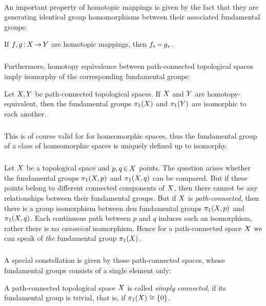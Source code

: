 \documentclass[11pt,twoside]{article}
\begin{document}
\paragraph{}
An important property of homotopic mappings is given by the fact
that they are generating identical group homomorphisms between their associated
fundamental groups:

\begin{theorem1}
If $f,g{\,:\,}X {\,\to\,} Y$ are homotopic mappings,
then $f_{*} {\,=\,} g_{*}$.
\end{theorem1}

\subparagraph{}
Furthermore,
homotopy equivalence between path-connected topological spaces
imply isomorphy of the corresponding fundamental groups:

\begin{theorem1}
Let $X,Y$ be path-connected topological spaces.
If $X$ and $Y$ are homotopy-equivalent,
then the fundamental groups $\pi_1(X)$ and $\pi_1(Y)$
are isomorphic to each another.
\end{theorem1}

\subparagraph{}
This is of course valid for for homeomorphic spaces,
thus the fundamental group of a class of homeomorphic spaces
is uniquely defined up to isomorphy.

\subparagraph{}
Let $X$ be a topological space and $p,q {\,\in\,} X$ points.
The question arises
whether the fundamental groups $\pi_1(X,p)$ and $\pi_1(X,q)$
can be compared.
But if these points belong to different connected components of $X$,
then there cannot be any relationships between their fundamental groups.
But if $X$ is \textit{path-connected},
then there is a group isomorphism
between den fundamental groups $\pi_1(X,p)$ and $\pi_1(X,q)$.
Each continuous path between $p$ and $q$ induces such an isomorphism,
rather there is no \textit{canonical} isomorphism.
Hence for a path-connected space $X$ we can speak of
\textit{the} fundamental group $\pi_1(X)$.

\subparagraph{}
A special constellation is given by those path-connected spaces,
whose fundamental groups consists of a single element only:

\begin{definition} %
A path-connected topological space $X$ is called
\textit{simply connected},
if its fundamental group is trivial,
that is,
if $\pi_1(X) \cong \{0\}$.
\end{definition}
\end{document}
